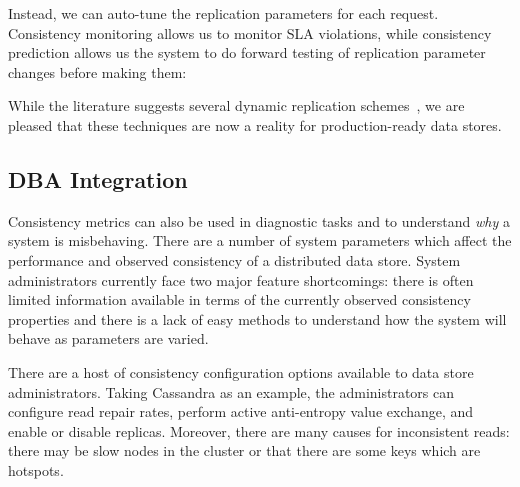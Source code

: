 Instead, we can auto-tune the replication parameters for each
request. Consistency monitoring allows us to monitor SLA violations,
while consistency prediction allows us the system to do forward testing of
replication parameter changes before making them:


While the literature suggests several dynamic replication
schemes~\cite{vahdat-article}, we are pleased that these
techniques are now a reality for production-ready data stores.

\subsection{DBA Integration}
\label{sec:dba}

Consistency metrics can also be used in diagnostic tasks and to
understand \textit{why} a system is misbehaving. There are a number of
system parameters which affect the performance and observed
consistency of a distributed data store. System administrators
currently face two major feature shortcomings: there is often limited
information available in terms of the currently observed consistency
properties and there is a lack of easy methods to understand how the
system will behave as parameters are varied.


There are a host of consistency configuration options available to
data store administrators. Taking Cassandra as an example, the administrators can
configure read repair rates, perform active anti-entropy value
exchange, and enable or disable replicas. Moreover, there are many
causes for inconsistent reads: there may be slow nodes in the cluster
or that there are some keys which are hotspots.


